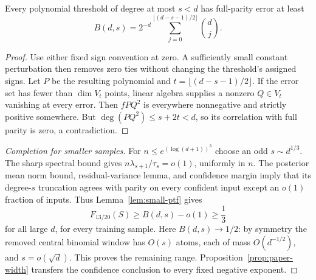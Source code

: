 \begin{lemma}
\label{lem:small-ptf}
Every polynomial threshold of degree at most $s<d$ has full-parity
error at least
\[
 B(d,s)=2^{-d}\sum_{j=0}^{\lfloor(d-s-1)/2\rfloor}\binom dj.
\]
\end{lemma}
\begin{proof}
Use either fixed sign convention at zero. A sufficiently small constant
perturbation then removes zero ties without changing the threshold's
assigned signs. Let $P$ be the resulting
polynomial and $t=\lfloor(d-s-1)/2\rfloor$. If the error set has fewer
than $\dim V_t$ points, linear algebra supplies a nonzero $Q\in V_t$
vanishing at every error. Then $fPQ^2$ is everywhere nonnegative and
strictly positive somewhere. But $\deg(PQ^2)\le s+2t<d$, so its
correlation with full parity is zero, a contradiction.
\end{proof}

\begin{proof}[Completion for smaller samples]
For $n\le e^{(\log(d+1))^3}$ choose an odd $s\sim d^{1/3}$. The
sharp spectral bound gives $n\lambda_{s+1}/\tau_s=o(1)$, uniformly
in $n$. The posterior mean norm bound, residual-variance lemma, and
confidence margin imply that its degree-$s$ truncation agrees with
parity on every confident input except an $o(1)$ fraction of inputs.
Thus Lemma~\ref{lem:small-ptf} gives
\[
 F_{13/20}(S)\ge B(d,s)-o(1)\ge\frac13
\]
for all large $d$, for every training sample. Here $B(d,s)\to1/2$:
by symmetry the removed central binomial window has $O(s)$ atoms,
each of mass $O(d^{-1/2})$, and $s=o(\sqrt d)$.
This proves the remaining range. Proposition~\ref{prop:paper-width}
transfers the confidence conclusion to every fixed negative exponent.
\end{proof}
